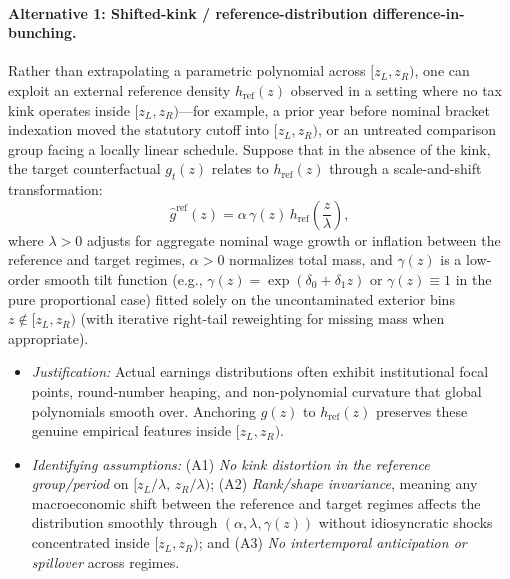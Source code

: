 \paragraph{Alternative 1: Shifted-kink / reference-distribution difference-in-bunching.}
Rather than extrapolating a parametric polynomial across $[z_L, z_R)$, one can exploit an external reference density $h_{\text{ref}}(z)$ observed in a setting where no tax kink operates inside $[z_L, z_R)$—for example, a prior year before nominal bracket indexation moved the statutory cutoff into $[z_L, z_R)$, or an untreated comparison group facing a locally linear schedule. Suppose that in the absence of the kink, the target counterfactual $g_t(z)$ relates to $h_{\text{ref}}(z)$ through a scale-and-shift transformation:
\begin{equation}
\hat{g}^{\mathrm{ref}}(z) = \alpha\,\gamma(z)\,h_{\mathrm{ref}}\!\left(\frac{z}{\lambda}\right),
\label{eq:p2_alt1}
\end{equation}
where $\lambda > 0$ adjusts for aggregate nominal wage growth or inflation between the reference and target regimes, $\alpha > 0$ normalizes total mass, and $\gamma(z)$ is a low-order smooth tilt function (e.g., $\gamma(z) = \exp(\delta_0 + \delta_1 z)$ or $\gamma(z) \equiv 1$ in the pure proportional case) fitted solely on the uncontaminated exterior bins $z \notin [z_L, z_R)$ (with iterative right-tail reweighting for missing mass when appropriate).
\begin{itemize}
    \item \emph{Justification:} Actual earnings distributions often exhibit institutional focal points, round-number heaping, and non-polynomial curvature that global polynomials smooth over. Anchoring $g(z)$ to $h_{\text{ref}}(z)$ preserves these genuine empirical features inside $[z_L, z_R)$.
    \item \emph{Identifying assumptions:} (A1) \emph{No kink distortion in the reference group/period} on $[z_L/\lambda,\, z_R/\lambda)$; (A2) \emph{Rank/shape invariance}, meaning any macroeconomic shift between the reference and target regimes affects the distribution smoothly through $(\alpha, \lambda, \gamma(z))$ without idiosyncratic shocks concentrated inside $[z_L, z_R)$; and (A3) \emph{No intertemporal anticipation or spillover} across regimes.
\end{itemize}

